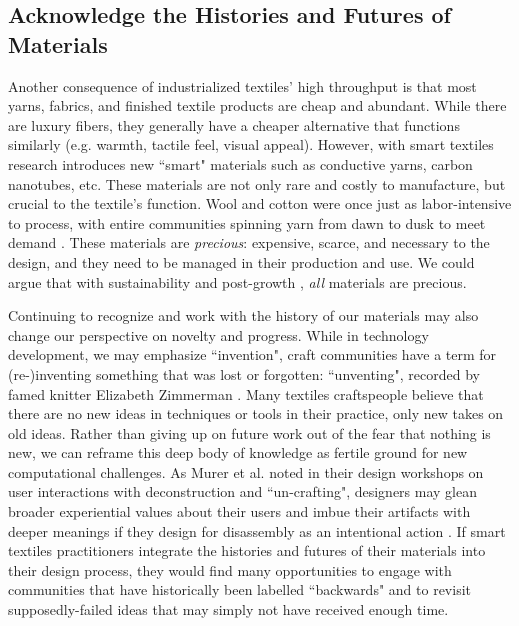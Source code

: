 \subsection{Acknowledge the Histories and Futures of Materials}

Another consequence of industrialized textiles' high throughput is that most yarns, fabrics, and finished textile products are cheap and abundant. While there are luxury fibers, they generally have a cheaper alternative that functions similarly (e.g. warmth, tactile feel, visual appeal). However, with smart textiles research introduces new ``smart" materials such as conductive yarns, carbon nanotubes, etc. These materials are not only rare and costly to manufacture, but crucial to the textile's function. Wool and cotton were once just as labor-intensive to process, with entire communities spinning yarn from dawn to dusk to meet demand \cite{black_knitting:_2012}. These materials are \emph{precious}: expensive, scarce, and necessary to the design, and they need to be managed in their production and use. We could argue that with sustainability and post-growth \cite{fletcher_craft_2016}, \emph{all} materials are precious.

Continuing to recognize and work with the history of our materials may also change our perspective on novelty and progress. While in technology development, we may emphasize ``invention", craft communities have a term for (re-)inventing something that was lost or forgotten: ``unventing", recorded by famed knitter Elizabeth Zimmerman \cite{zimmermann_almanac_2012}. Many textiles craftspeople believe that there are no new ideas in techniques or tools in their practice, only new takes on old ideas. Rather than giving up on future work out of the fear that nothing is new, we can reframe this deep body of knowledge as fertile ground for new computational challenges. As Murer et al. noted in their design workshops on user interactions with deconstruction and ``un-crafting", designers may glean broader experiential values about their users and imbue their artifacts with deeper meanings if they design for disassembly as an intentional action \cite{Murer:2018:MTA:3196709.3196806, Murer:2017:UDE:3024969.3024993, Murer:2015:DID:2882850.2882860}. If smart textiles practitioners integrate the histories and futures of their materials into their design process, they would find many opportunities to engage with communities that have historically been labelled ``backwards" and to revisit supposedly-failed ideas that may simply not have received enough time.

